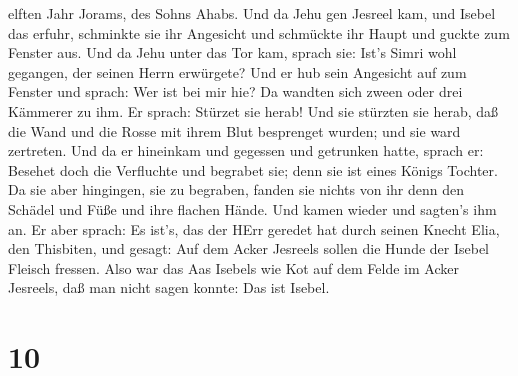 elften Jahr Jorams, des Sohns Ahabs.  Und da Jehu gen
Jesreel kam, und Isebel das erfuhr, schminkte sie ihr Angesicht und
schmückte ihr Haupt und guckte zum Fenster aus.  Und da
Jehu unter das Tor kam, sprach sie: Ist's Simri wohl gegangen, der
seinen Herrn erwürgete?  Und er hub sein Angesicht auf zum
Fenster und sprach: Wer ist bei mir hie? Da wandten sich zween oder drei
Kämmerer zu ihm.  Er sprach: Stürzet sie herab! Und sie
stürzten sie herab, daß die Wand und die Rosse mit ihrem Blut besprenget
wurden; und sie ward zertreten.  Und da er hineinkam und
gegessen und getrunken hatte, sprach er: Besehet doch die Verfluchte und
begrabet sie; denn sie ist eines Königs Tochter.  Da sie
aber hingingen, sie zu begraben, fanden sie nichts von ihr denn den
Schädel und Füße und ihre flachen Hände.  Und kamen wieder
und sagten's ihm an. Er aber sprach: Es ist's, das der HErr geredet hat
durch seinen Knecht Elia, den Thisbiten, und gesagt: Auf dem Acker
Jesreels sollen die Hunde der Isebel Fleisch fressen.  Also
war das Aas Isebels wie Kot auf dem Felde im Acker Jesreels, daß man
nicht sagen konnte: Das ist Isebel.

\hypertarget{section-9}{%
\section{10}\label{section-9}}

